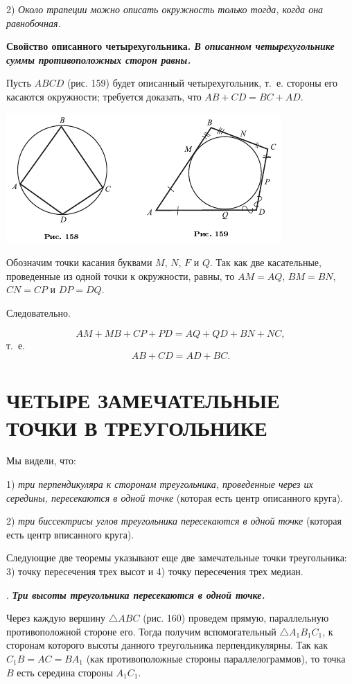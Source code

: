 \documentclass[oneside]{book}
\begin{document}
2) \emph{Около трапеции можно описать окружность только тогда, когда она равнобочная.}

\textbf{Свойство описанного четырехугольника.
\emph{В описанном четырехугольнике суммы противоположных сторон равны.}}

Пусть $ABCD$ (рис. 159) будет описанный четырехугольник, т.~е. стороны его касаются окружности;
требуется доказать, что $AB+CD=BC+AD$.

\includegraphics{pics/ris-158-159}

Обозначим точки касания буквами $M$, $N$, $F$ и $Q$.
Так как две касательные, проведенные из одной точки к окружности, равны, то $AM=AQ$, $BM=BN$, $CN=CP$ и $DP = DQ$.

Следовательно.

\[AM+MB+CP+PD = AQ + QD+BN+NC,\]
т.~е. 
\[AB+CD=AD+BC.\]

\section{ЧЕТЫРЕ ЗАМЕЧАТЕЛЬНЫЕ ТОЧКИ В ТРЕУГОЛЬНИКЕ}

Мы видели, что:

1) \emph{три перпендикуляра к сторонам треугольника, проведенные через их середины, пересекаются в одной точке} (которая есть центр описанного круга).

2) \emph{три биссектрисы углов треугольника пересекаются в одной точке} (которая есть центр вписанного круга).

Следующие две теоремы указывают еще две замечательные точки треугольника:
3) точку пересечения трех высот и 4) точку пересечения трех медиан.

.
\textbf{\emph{Три высоты треугольника пересекаются в одной точке.}}

Через каждую вершину $\triangle ABC$ (рис. 160) проведем прямую, параллельную противоположной стороне его.
Тогда получим вспомогательный $\triangle A_1B_1C_1$, к сторонам которого высоты данного треугольника перпендикулярны.
Так как $C_1B=AC=BA_1$ (как противоположные стороны параллелограммов), то точка $B$ есть середина стороны $A_1C_1$.
\end{document}

